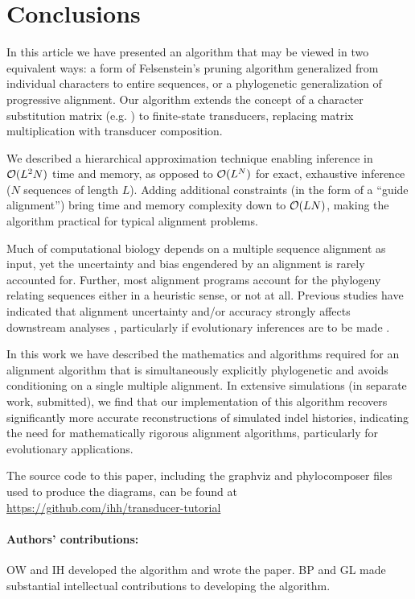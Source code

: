 \documentclass{article}
\begin{document}
\section{Conclusions}

In this article we have presented an algorithm that may be viewed in two equivalent ways: a form of Felsenstein's pruning algorithm generalized from individual characters to entire sequences, 
or a phylogenetic generalization of progressive alignment.   
Our algorithm  extends the concept of a character substitution matrix (e.g. \cite{JukesCantor69, HasegawaEtAl85}) to finite-state transducers, replacing matrix multiplication with transducer composition.

We described a hierarchical  approximation technique enabling inference in ${\cal O}(L^2N)$ time and memory, as opposed to ${\cal O}(L^N)$ for exact, exhaustive inference ($N$ sequences of length $L$). 
Adding additional constraints (in the form of a ``guide alignment'')  bring time and memory complexity down to ${\cal O}(LN)$, making the algorithm practical for typical alignment problems.  

Much of computational biology depends on a multiple sequence alignment as input, yet the uncertainty and bias engendered by an alignment is rarely accounted for.  
Further, most alignment programs account for the phylogeny relating sequences either in a heuristic sense, or not at all.  
Previous studies have indicated that alignment uncertainty and/or accuracy  strongly affects downstream analyses \cite{WongEtAl2008}, particularly if evolutionary inferences are to be made \cite{LoytynojaGoldman2008}.

In this work we have described  the mathematics and algorithms required for an alignment algorithm that is simultaneously explicitly phylogenetic and avoids conditioning on a single multiple alignment.
  In extensive simulations (in separate work, submitted), we find that our implementation of this algorithm recovers significantly more accurate reconstructions of simulated indel histories, 
indicating the need for mathematically rigorous alignment algorithms, particularly for evolutionary applications. 

The source code to this paper, including the graphviz and phylocomposer files used to produce the diagrams,
can be found at \url{https://github.com/ihh/transducer-tutorial}

\paragraph{Authors' contributions:} OW and IH developed the algorithm and wrote the paper.  BP and GL made substantial intellectual contributions to developing the algorithm.  
\end{document}
